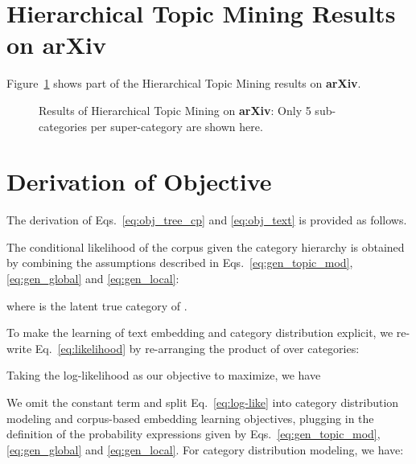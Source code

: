 \documentclass[sigconf]{acmart}
\theoremstyle{definition}
\begin{document}
\clearpage
\appendix

\section{Hierarchical Topic Mining Results on arXiv}
\label{sec:arxiv}

Figure~\ref{fig:arxiv} shows part of the Hierarchical Topic Mining results on \textbf{arXiv}. 
\vspace*{-3.2ex}
\begin{figure}[h]
	\centering
	\vspace*{-2ex}
	\caption{Results of Hierarchical Topic Mining on \textbf{arXiv}: Only 5 sub-categories per super-category are shown here.}
	\label{fig:arxiv}
\end{figure}

\vspace*{-2ex}
\section{Derivation of Objective}
\label{sec:app_obj}



The derivation of Eqs.~\eqref{eq:obj_tree_cp} and \eqref{eq:obj_text} is provided as follows.

The conditional likelihood of the corpus given the category hierarchy is obtained by combining the assumptions described in Eqs.~\eqref{eq:gen_topic_mod}, \eqref{eq:gen_global} and \eqref{eq:gen_local}:

where  is the latent true category of .

To make the learning of text embedding and category distribution explicit, we re-write Eq.~\eqref{eq:likelihood} by re-arranging the product of  over categories:


Taking the log-likelihood as our objective to maximize, we have


We omit the constant term and split Eq.~\eqref{eq:log-like} into category distribution modeling and corpus-based embedding learning objectives, plugging in the definition of the probability expressions given by Eqs.~\eqref{eq:gen_topic_mod}, \eqref{eq:gen_global} and \eqref{eq:gen_local}. For category distribution modeling, we have:
\end{document}
